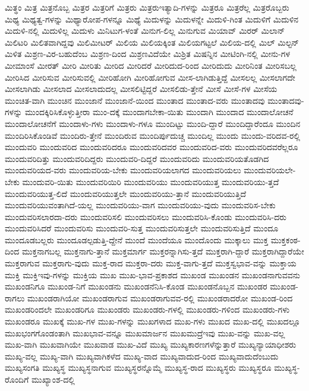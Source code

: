 {ಮಿತ್ಥಂ
ಮಿತ್ರ
ಮಿತ್ರನೊಬ್ಬ
ಮಿತ್ರರ
ಮಿತ್ರರಿಗೆ
ಮಿತ್ರರು
ಮಿತ್ರರುಇತ್ಯಾದಿ-ಗಳನ್ನು
ಮಿತ್ರರೂ
ಮಿತ್ರರೆಲ್ಲ
ಮಿತ್ರರೊಬ್ಬರು
ಮಿಥ್ಯ
ಮಿಥ್ಯತ್ವ-ಗಳನ್ನು
ಮಿಥ್ಯಾರೋಪ-ಗಳನ್ನೂ
ಮಿಥ್ಯೆ
ಮಿದುಳನ್ನು
ಮಿದುಳನ್ನೇ
ಮಿದುಳಿ-ಗಿಂತ
ಮಿದುಳಿಗೆ
ಮಿದುಳಿನ
ಮಿದುಳಿ-ನಲ್ಲಿ
ಮಿದುಳಿಲ್ಲ
ಮಿದುಳು
ಮಿನಿಟುಗ-ಳಂತೆ
ಮಿನುಗ-ಲಿಲ್ಲ
ಮಿನುಗುವ
ಮಿಯಾವ್
ಮಿರರ್
ಮಿಲಾನ್
ಮಿಲಿಟರಿ
ಮಿಲಿತವಾಗಿದ್ದವು
ಮಿಲಿಮೀಟರ್
ಮಿಲಿಯ
ಮಿಲಿಯಕ್ಕಿಂತ
ಮಿಲಿಯಗಟ್ಟಲೆ
ಮಿಲಿಯ-ದಲ್ಲಿ
ಮಿಲ್
ಮಿಲ್ಟನ್
ಮಿಳಿತ
ಮಿಶ್ರಣ-ವಿರ-ಬಹುದೆಂಬ
ಮಿಶ್ರಣ-ದಿಂದ
ಮಿಶ್ರಣವಿದೆಯೇ
ಮಿಶ್ರಿತ
ಮಿಷನ್ನಿನ
ಮೀಟಿಂಗಿ-ನಲ್ಲಿ
ಮೀನು-ಗಳ
ಮೀಮಾಂಸೆ
ಮೀರತ್
ಮೀರಿ
ಮೀರಿತು
ಮೀರಿದ
ಮೀರಿದರೆ
ಮೀರಿದುದ-ರಿಂದ
ಮೀರಿದುದು
ಮೀರಿನಿಂತ
ಮೀರಿಸಬಲ್ಲ
ಮೀರಿಸಿದ
ಮೀರಿಸುವ
ಮೀರಿಸುವಲ್ಲಿ
ಮೀರಿಹೋಗಿ
ಮೀರಿಹೋಗುವ
ಮೀಸ-ಲಾಗಿಡುತ್ತಿದ್ದೆ
ಮೀಸಲಲ್ಲ
ಮೀಸಲಾಗದೇ
ಮೀಸಲಾಗಿಡು
ಮೀಸಲಾದ
ಮೀಸಲಾದುದಲ್ಲ
ಮೀಸಲಿಟ್ಟಿದ್ದರೆ
ಮೀಸಲಿಡು-ತ್ತೇನೆ
ಮೀಸೆ
ಮೀಸೆ-ಗಳ
ಮೀಸೆಯ
ಮುಂಚಿತ-ವಾಗಿ
ಮುಂಚಿನ
ಮುಂಜಾನೆ
ಮುಂಜಾನೆ-ಯಿಂದ
ಮುಂತಾದ
ಮುಂತಾದ-ವರು
ಮುಂತಾದವು
ಮುಂತಾದವು-ಗಳನ್ನು
ಮುಂದಕ್ಕಿರಿಸಿಕೊಳ್ಳುತ್ತೀರಾ
ಮುಂ-ದಕ್ಕೆ
ಮುಂದಾಗಬೇಕಾ-ಯಿತು
ಮುಂದಾಗಿ
ಮುಂದಾದ
ಮುಂದಾಲೋಚನೆ
ಮುಂದಾಲೋಚನೆಗೆ
ಮುಂದಾಳು-ಗಳು
ಮುಂದಾಳು-ಗಳೂ
ಮುಂದಿಟ್ಟು
ಮುಂದಿ-ದ್ದಾರೆ
ಮುಂದಿದ್ದಾರೆಂದೂ
ಮುಂದಿನ
ಮುಂದಿರಿಸಿಕೊಂಡಿವೆ
ಮುಂದಿರು-ತ್ತೇನೆ
ಮುಂದಿರುವ
ಮುಂದಿರ್ಪುದುಚ್ಚ
ಮುಂದಿಲ್ಲ
ಮುಂದು
ಮುಂದು-ವರಿದವ-ರಲ್ಲಿ
ಮುಂದುವರಿ
ಮುಂದುವರಿದ
ಮುಂದುವರಿದರೂ
ಮುಂದುವರಿದವರ
ಮುಂದುವರಿದ-ವರು
ಮುಂದುವರಿದವರೆಲ್ಲರೂ
ಮುಂದುವರಿದಿತ್ತು
ಮುಂದುವರಿದಿದ್ದರು
ಮುಂದುವರಿ-ದಿದ್ದರೆ
ಮುಂದುವರಿದು
ಮುಂದುವರಿಯತೊಡಗಿದ
ಮುಂದುವರಿಯದ-ವರು
ಮುಂದುವರಿಯ-ಬೇಕು
ಮುಂದುವರಿಯಲಾಗದ
ಮುಂದುವರಿಯಲು
ಮುಂದುವರಿಯಲೇ-ಬೇಕು
ಮುಂದುವರಿ-ಯಿತು
ಮುಂದುವರಿಯಿರಿ
ಮುಂದುವರಿಯು
ಮುಂದುವರಿಯುತ್ತ
ಮುಂದುವರಿಯು-ತ್ತದೆ
ಮುಂದುವರಿಯುತ್ತ-ಲಿದೆ
ಮುಂದುವರಿಯುತ್ತಲೇ
ಮುಂದುವರಿಯು-ತ್ತಾನೆ
ಮುಂದುವರಿಯುತ್ತಿದೆ
ಮುಂದುವರಿಯುವಂತಾಗಿದೆ-ಯಲ್ಲ
ಮುಂದುವರಿಯು-ವಾಗ
ಮುಂದುವರಿಯು-ವುದು
ಮುಂದುವರಿಸ-ಬೇಕು
ಮುಂದುವರಿಸಲಾರದಾ-ದರು
ಮುಂದುವರಿಸಲಿ
ಮುಂದುವರಿಸಲು
ಮುಂದುವರಿಸಿ-ಕೊಂಡು
ಮುಂದುವರಿಸಿ-ದರು
ಮುಂದುವರಿಸಿದರೆ
ಮುಂದುವರಿಸು
ಮುಂದುವರಿ-ಸುತ್ತ
ಮುಂದುವರಿಸುತ್ತಲೇ
ಮುಂದುವರಿಸುತ್ತಿದೆ
ಮುಂದೂ
ಮುಂದೂಡಬಲ್ಲರು
ಮುಂದೂಡಲ್ಪಡುತ್ತಿ-ದ್ದೇನೆ
ಮುಂದೆ
ಮುಂದೆಯೂ
ಮುಂದೊಂದು
ಮುಕ್ಕಾಲು
ಮುಕ್ತ
ಮುಕ್ತಕಂಠ-ದಿಂದ
ಮುಕ್ತನಾಗಬಲ್ಲ
ಮುಕ್ತನಾಗು-ತ್ತಾನೆ
ಮುಕ್ತಮಾರ್ಗ
ಮುಕ್ತರನ್ನಾಗಿಸು-ತ್ತದೆ
ಮುಕ್ತರಾಗಿ-ದ್ದಾರೆ
ಮುಕ್ತರಾಗಿದ್ದಾರೆಯೇ
ಮುಕ್ತರಾಗುವ
ಮುಕ್ತರಾಗು-ವುದು
ಮುಕ್ತ-ರಾದ
ಮುಕ್ತರಾ-ದರು
ಮುಕ್ತ-ವಾಗು-ತ್ತದೆ
ಮುಕ್ತಸ್ವಭಾವ-ವನ್ನು
ಮುಕ್ತಾಯ
ಮುಕ್ತಿ
ಮುಕ್ತಿಇವು-ಗಳನ್ನು
ಮುಕ್ತಿಯ
ಮುಖ
ಮುಖ-ಭಾವ-ಪ್ರಕಾಶದ
ಮುಖಂಡ
ಮುಖಂಡನ
ಮುಖಂಡನಾಗುವವನು
ಮುಖಂಡನಿಗೂ
ಮುಖಂಡ-ನಿಗೆ
ಮುಖಂಡನು
ಮುಖಂಡನೆನಿಸಿ-ಕೊಂಡ
ಮುಖಂಡನೊಬ್ಬನ
ಮುಖಂಡರ
ಮುಖಂಡ-ರಾಗಲು
ಮುಖಂಡರಾಗಿಯೋ
ಮುಖಂಡರಾಗುವ
ಮುಖಂಡರಾಗುವವ-ರಲ್ಲಿ
ಮುಖಂಡರಾದರೋ
ಮುಖಂಡ-ರಿಂದ
ಮುಖಂಡರಿಂದಲೇ
ಮುಖಂಡರಿಗೂ
ಮುಖಂಡರು
ಮುಖಂಡರು-ಗಳಲ್ಲಿ
ಮುಖಂಡರು-ಗಳಿಂದ
ಮುಖಂಡರು-ಗಳು
ಮುಖಂಡರೂ
ಮುಖಕ್ಕೆ
ಮುಖ-ಗಳ
ಮುಖ-ಗಳನ್ನು
ಮುಖಗಳಾದ
ಮುಖ-ಗಳು
ಮುಖದ
ಮುಖ-ದಲ್ಲಿ
ಮುಖದಲ್ಲೂ
ಮುಖಭಂಗಗೊಂಡಂತಾಗಿ
ಮುಖಭಾವ-ವನ್ನೂ
ಮುಖಮಾರ್ಜನ
ಮುಖಮುದ್ರೆಇವು
ಮುಖ-ವನ್ನು
ಮುಖ-ವಲ್ಲ
ಮುಖ-ವಾಗಿ
ಮುಖವಾಗಿಯೇ
ಮುಖವಾಡ
ಮುಖ-ವಿದೆ
ಮುಖ್ಯ
ಮುಖ್ಯಕಾರಣಗಳೆನ್ನುತ್ತಾರೆ
ಮುಖ್ಯನ್ಯಾಯಾಧೀಶರು
ಮುಖ್ಯ-ವಲ್ಲ
ಮುಖ್ಯ-ವಾಗಿ
ಮುಖ್ಯವಾಗಿಕಳೆದ
ಮುಖ್ಯ-ವಾದ
ಮುಖ್ಯವಾದುದ-ರಿಂದ
ಮುಖ್ಯವಾದುದೆಂಬುದು
ಮುಖ್ಯಸಂಗತಿ
ಮುಖ್ಯಸ್ಥ
ಮುಖ್ಯಸ್ಥನಾಗುವ
ಮುಖ್ಯಸ್ಥರನ್ನೊಮ್ಮೆ
ಮುಖ್ಯಸ್ಥ-ರಾದ
ಮುಖ್ಯಸ್ಥರು
ಮುಖ್ಯಸ್ಥರೂ
ಮುಖ್ಯಸ್ಥ-ರೊಂದಿಗೆ
ಮುಖ್ಯಾಂಶ-ದಲ್ಲಿ
}
